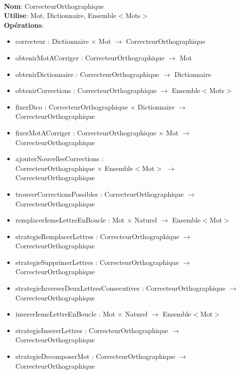 \documentclass{article}
\begin{document}
    \noindent
    \\
    \textbf{Nom}: CorrecteurOrthographique \\
    \textbf{Utilise}: Mot, Dictionnaire, Ensemble$<$Mots$>$ \\
    \textbf{Opérations}: \begin{itemize}[label=$\ $, leftmargin=2cm, itemsep=0cm]
        \item correcteur : Dictionnaire $\times$ Mot $\rightarrow$ CorrecteurOrthographique
        \item obtenirMotACorriger : CorrecteurOrthographique $\rightarrow$ Mot
        \item obtenirDictionnaire : CorrecteurOrthographique $\rightarrow$ Dictionnaire
        \item obtenirCorrections : CorrecteurOrthographique $\rightarrow$ Ensemble$<$Mots$>$
        \item fixerDico : CorrecteurOrthographique $\times$ Dictionnaire $\rightarrow$ CorrecteurOrthographique
        \item fixerMotACorriger : CorrecteurOrthographique $\times$ Mot $\rightarrow$ CorrecteurOrthographique
        \item ajouterNouvellesCorrections : \\ CorrecteurOrthographique $\times$ Ensemble$<$Mot$>$ $\rightarrow$ CorrecteurOrthographique
        \item trouverCorrectionsPossibles : CorrecteurOrthographique $\rightarrow$ CorrecteurOrthographique
        \item remplacerIemeLettreEnBoucle : Mot $\times$ Naturel $\rightarrow$ Ensemble$<$Mot$>$
        \item strategieRemplacerLettres : CorrecteurOrthographique $\rightarrow$ CorrecteurOrthographique
        \item strategieSupprimerLettres : CorrecteurOrthographique $\rightarrow$ CorrecteurOrthographique
        \item strategieInverserDeuxLettresConsecutives : CorrecteurOrthographique $\rightarrow$ CorrecteurOrthographique
        \item insererIemeLettreEnBoucle : Mot $\times$ Naturel $\rightarrow$ Ensemble$<$Mot$>$
        \item strategieInsererLettres : CorrecteurOrthographique $\rightarrow$ CorrecteurOrthographique
        \item strategieDecomposerMot : CorrecteurOrthographique $\rightarrow$ CorrecteurOrthographique
    \end{itemize}
\end{document}
